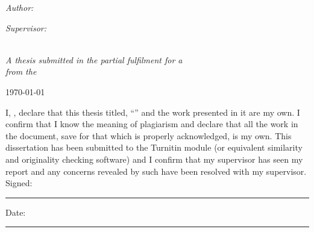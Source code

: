 \documentclass[
11pt,
oneside, 
english,
singlespacing,
headsepline, 
fleqn
]{MastersDoctoralThesis}
\begin{document}
\begin{titlepage}
\begin{center}
\begin{minipage}[t]{0.4\textwidth}
\begin{flushleft} \large
\emph{Author:}\\
\href{https://devon12stone.github.io/E-Portfolio2/}{\authorname} %
\end{flushleft}
\end{minipage}
\begin{minipage}[t]{0.4\textwidth}
\begin{flushright} \large
\emph{Supervisor:} \\
\href{http://www.jamessmith.com}{\supname} %
\end{flushright}
\end{minipage}\\
\vspace{2cm}
\large \textit{A thesis submitted in the partial fulfilment for a \degreename}\\[0.3cm] %
\textit{from the}\\[1cm]
{\scshape\LARGE\facname\par}\vspace{1cm} %
{\large \today}\\[2cm] %
\vfill
\end{center}
\end{titlepage}


\begin{declaration}
\addchaptertocentry{\authorshipname} %
\noindent I, \authorname, declare that this thesis titled, \enquote{\ttitle} and the work presented in it are my own. I confirm that I know the meaning of plagiarism and declare that all the work in the document, save for that which is properly acknowledged, is my own. This dissertation has been submitted to the Turnitin module (or  equivalent similarity and originality checking software) and I confirm that my supervisor has seen my report and any concerns revealed by such have been resolved with my supervisor. \\
 
\noindent Signed:\\
\rule[0.5em]{25em}{0.5pt} %
 
\noindent Date:\\
\rule[0.5em]{25em}{0.5pt} %
\end{declaration}
\end{document}
